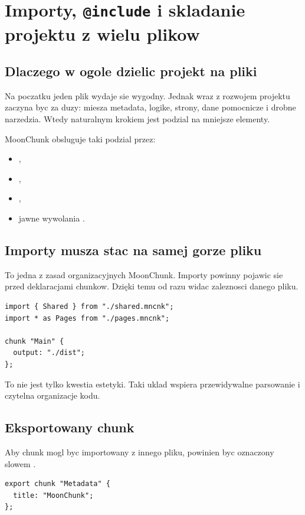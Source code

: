 \chapter{Importy, \texttt{@include} i skladanie projektu z wielu plikow}

\section{Dlaczego w ogole dzielic projekt na pliki}
Na poczatku jeden plik wydaje sie wygodny. Jednak wraz z rozwojem projektu zaczyna byc
za duzy: miesza metadata, logike, strony, dane pomocnicze i drobne narzedzia. Wtedy
naturalnym krokiem jest podzial na mniejsze elementy.

MoonChunk obsluguje taki podzial przez:

\begin{itemize}
  \item {},
  \item {},
  \item {},
  \item jawne wywolania .
\end{itemize}

\section{Importy musza stac na samej gorze pliku}
To jedna z zasad organizacyjnych MoonChunk. Importy powinny pojawic sie przed deklaracjami
chunkow. Dzięki temu od razu widac zaleznosci danego pliku.

\begin{lstlisting}[style=moonchunk,caption={Importy na samej gorze pliku}]
import { Shared } from "./shared.mncnk";
import * as Pages from "./pages.mncnk";

chunk "Main" {
  output: "./dist";
};
\end{lstlisting}

To nie jest tylko kwestia estetyki. Taki uklad wspiera przewidywalne parsowanie i czytelna
organizacje kodu.

\section{Eksportowany chunk}
Aby chunk mogl byc importowany z innego pliku, powinien byc oznaczony slowem .

\begin{lstlisting}[style=moonchunk,caption={Chunk eksportowany do innych plikow}]
export chunk "Metadata" {
  title: "MoonChunk";
};
\end{lstlisting}

